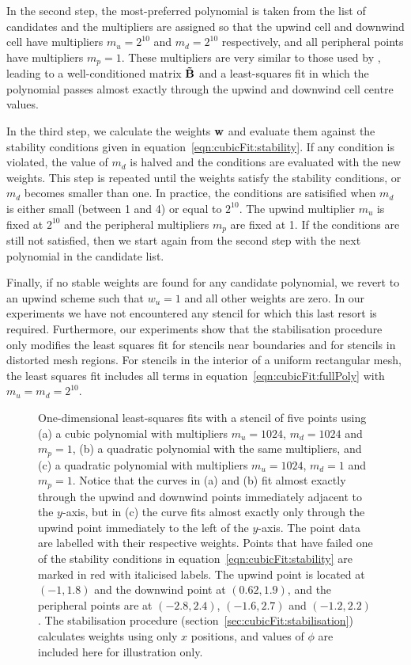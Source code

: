 In the second step, the most-preferred polynomial is taken from the list of candidates and the multipliers are assigned so that the upwind cell and downwind cell have multipliers $m_u = 2^{10}$ and $m_d = 2^{10}$ respectively, and all peripheral points have multipliers $m_p = 1$.  These multipliers are very similar to those used by \citet{lashley2002}, leading to a well-conditioned matrix $\mathbf{\tilde{B}}$ and a least-squares fit in which the polynomial passes almost exactly through the upwind and downwind cell centre values.

In the third step, we calculate the weights $\mathbf{w}$ and evaluate them against the stability conditions given in equation~\eqref{eqn:cubicFit:stability}.
If any condition is violated, the value of $m_d$ is halved and the conditions are evaluated with the new weights.  This step is repeated until the weights satisfy the stability conditions, or $m_d$ becomes smaller than one.  In practice, the conditions are satisified when $m_d$ is either small (between 1 and 4) or equal to $2^{10}$.  The upwind multiplier $m_u$ is fixed at $2^{10}$ and the peripheral multipliers $m_p$ are fixed at \num{1}.  If the conditions are still not satisfied, then we start again from the second step with the next polynomial in the candidate list. 

Finally, if no stable weights are found for any candidate polynomial, we revert to an upwind scheme such that $w_u = 1$ and all other weights are zero.
In our experiments we have not encountered any stencil for which this last resort is required.
Furthermore, our experiments show that the stabilisation procedure only modifies the least squares fit for stencils near boundaries and for stencils in distorted mesh regions.
For stencils in the interior of a uniform rectangular mesh, the least squares fit includes all terms in equation~\eqref{eqn:cubicFit:fullPoly} with $m_u = m_d = 2^{10}$.

\begin{figure}
	\centering
	
	\caption{One-dimensional least-squares fits with a stencil of five points using (a) a cubic polynomial with multipliers $m_u = 1024$, $m_d = 1024$ and $m_p = 1$, (b) a quadratic polynomial with the same multipliers, and (c) a quadratic polynomial with multipliers $m_u = 1024$, $m_d = 1$ and $m_p = 1$.  Notice that the curves in (a) and (b) fit almost exactly through the upwind and downwind points immediately adjacent to the $y$-axis, but in (c) the curve fits almost exactly only through the upwind point immediately to the left of the $y$-axis.  The point data are labelled with their respective weights.
	Points that have failed one of the stability conditions in equation~\eqref{eqn:cubicFit:stability} are marked in red with italicised labels.  The upwind point is located at $(-1, 1.8)$ and the downwind point at $(0.62, 1.9)$, and the peripheral points are at $(-2.8, 2.4)$, $(-1.6, 2.7)$ and $(-1.2, 2.2)$.  The stabilisation procedure (section~\ref{sec:cubicFit:stabilisation}) calculates weights using only $x$ positions, and values of $\phi$ are included here for illustration only.}
	\label{fig:cubicFit:oscillatory1D}
\end{figure}


